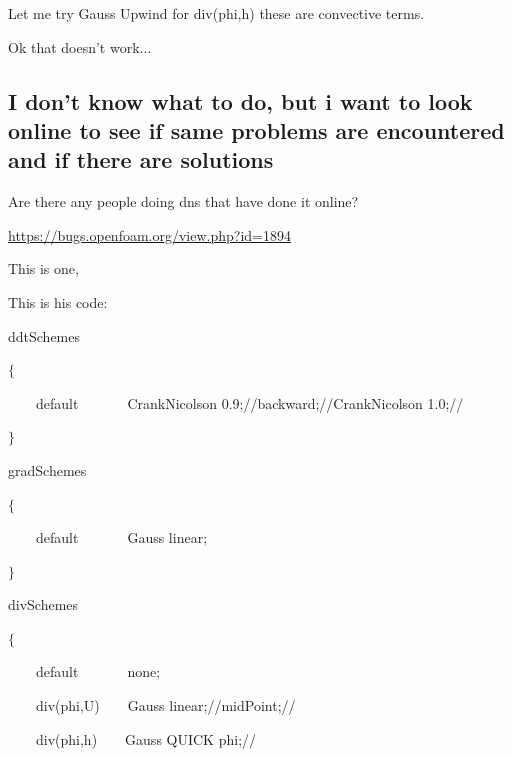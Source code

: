 \documentclass[12pt]{article}
\renewcommand{\_}{\kern-1.5pt\textunderscore\kern-1.5pt}
\begin{document}
Let me try Gauss Upwind for div(phi,h) these are convective terms.\par

Ok that doesn’t work$ \ldots $ \par
\subsection{I don't know what to do, but i want to look online to see if same problems are encountered and if there are solutions}

 Are there any people doing dns that have done it online?\par

\href{https://bugs.openfoam.org/view.php?id=1894}{https://bugs.openfoam.org/view.php?id=1894}\par

This is one,\par

This is his code:\par

ddtSchemes\par

$ \{ $ \par

\ \ \ \ default\ \ \ \ \ \ \   CrankNicolson 0.9;//backward;//CrankNicolson 1.0;//\par

$ \} $ \par


\vspace{\baselineskip}
gradSchemes\par

$ \{ $ \par

\ \ \ \ default\ \ \ \ \ \ \   Gauss linear;\par

$ \} $ \par


\vspace{\baselineskip}
divSchemes\par

$ \{ $ \par

\ \ \ \ default\ \ \ \ \ \ \   none;\par

\ \ \ \ div(phi,U)\ \ \ \   Gauss linear;//midPoint;//\par

\ \ \ \ div(phi,h)\ \ \ \   Gauss QUICK phi;//\par
\end{document}
